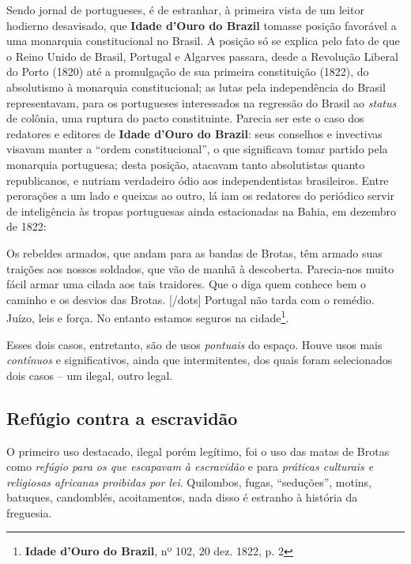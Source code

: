 Sendo jornal de portugueses, é de estranhar, à primeira vista de um leitor hodierno desavisado, que \textbf{Idade d'Ouro do Brazil} tomasse posição favorável a uma monarquia constitucional no Brasil. A posição só se explica pelo fato de que o Reino Unido de Brasil, Portugal e Algarves passara, desde a Revolução Liberal do Porto (1820) até a promulgação de sua primeira constituição (1822), do absolutismo à monarquia constitucional; as lutas pela independência do Brasil representavam, para os portugueses interessados na regressão do Brasil ao \textit{status} de colônia, uma ruptura do pacto constituinte. Parecia ser este o caso dos redatores e editores de \textbf{Idade d'Ouro do Brazil}: seus conselhos e invectivas visavam manter a ``ordem constitucional'', o que significava tomar partido pela monarquia portuguesa; desta posição, atacavam tanto absolutistas quanto republicanos, e nutriam verdadeiro ódio aos independentistas brasileiros. Entre perorações a um lado e queixas ao outro, lá iam os redatores do periódico servir de inteligência às tropas portuguesas ainda estacionadas na Bahia, em dezembro de 1822:

\begin{citacao}
Os rebeldes armados, que andam para as bandas de Brotas, têm armado suas traições aos nossos soldados, que vão de manhã à descoberta. Parecia-nos muito fácil armar uma cilada aos tais traidores. Que o diga quem conhece bem o caminho e os desvios das Brotas. [/dots] Portugal não tarda com o remédio. Juízo, leis e força. No entanto estamos seguros na cidade\footnote{\textbf{Idade d'Ouro do Brazil}, nº 102, 20 dez. 1822, p. 2}.
\end{citacao}



Esses dois casos, entretanto, são de usos \textit{pontuais} do espaço. Houve usos mais \textit{contínuos} e significativos, ainda que intermitentes, dos quais foram selecionados dois casos -- um ilegal, outro legal.

\subsection{Refúgio contra a escravidão}\label{subsec:refugioescrav}

O primeiro uso destacado, ilegal porém legítimo, foi o uso das matas de Brotas como \textit{refúgio para os que escapavam à escravidão} e para \textit{práticas culturais e religiosas africanas proibidas por lei}. Quilombos, fugas, ``seduções'', motins, batuques, candomblés, acoitamentos, nada disso é estranho à história da freguesia.

